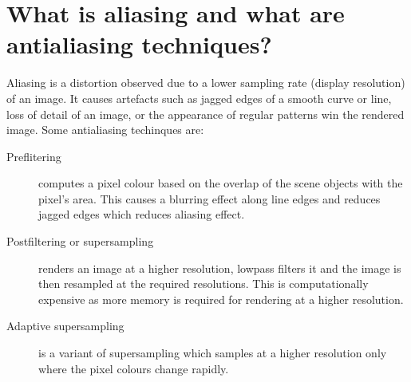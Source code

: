 \documentclass[a4paper,14pt,english,crop=false]{standalone}
\begin{document}
\section{What is aliasing and what are antialiasing techniques?}
Aliasing is a distortion observed due to a lower sampling rate (display
resolution) of an image. It causes artefacts such as jagged edges of a smooth
curve or line, loss of detail of an image, or the appearance of regular patterns
win the rendered image.
Some antialiasing techinques are:
\begin{description}
  \item [Preflitering] {computes a pixel colour based on the overlap of the
      scene objects with the pixel's area. This causes a blurring effect along
      line edges and reduces jagged edges which reduces aliasing effect.}
  \item [Postfiltering or supersampling] {renders an image at a higher
      resolution, lowpass filters it and the image is then resampled at the
      required resolutions.  This is computationally expensive as more memory is
      required for rendering at a higher resolution.}
  \item [Adaptive supersampling] {is a variant of supersampling which samples at
      a higher resolution only where the pixel colours change rapidly.}
\end{description}
\end{document}
